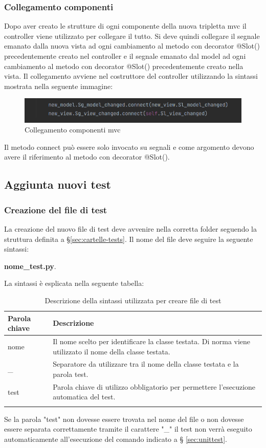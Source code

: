 \subsubsection{Collegamento componenti}
Dopo aver creato le strutture di ogni componente della nuova tripletta mvc il controller viene utilizzato per collegare il tutto. 
Si deve quindi collegare il segnale emanato dalla nuova vista ad ogni cambiamento al metodo con decorator @Slot() precedentemente creato nel controller e il segnale emanato dal model ad ogni cambiamento al metodo con decorator @Slot() precedentemente creato nella vista. Il collegamento avviene nel costruttore del controller utilizzando la sintassi mostrata nella seguente immagine:
\begin{figure}[H]
    \centering
    \includegraphics[scale = 0.50]{components/img/collegamento-segnali-mvc.png}
    \caption{Collegamento componenti mvc}
    \label{fig:Collegamento componenti mvc}
\end{figure}
Il metodo connect può essere solo invocato su segnali e come argomento devono avere il riferimento al metodo con decorator @Slot().

\subsection{Aggiunta nuovi test}
\subsubsection{Creazione del file di test}
La creazione del nuovo file di test deve avvenire nella corretta folder seguendo la struttura definita a \S{}\ref{sec:cartelle-tests}. Il nome del file deve seguire la seguente sintassi: \newline{} \centerline{\textbf{nome\_test.py}.} La sintassi è esplicata nella seguente tabella:
{
	\setlength{\freewidth}{\dimexpr\textwidth-1\tabcolsep}
	\renewcommand{\arraystretch}{1.5}
	\setlength{\aboverulesep}{0pt}
	\setlength{\belowrulesep}{0pt}
	\begin{longtable}{L{.15\freewidth} L{.85\freewidth}}
		\textbf{Parola chiave} & \textbf{Descrizione}\\
		\toprule
		\endhead	
		nome & Il nome scelto per identificare la classe testata. Di norma viene utilizzato il nome della classe testata.\\
		\_ & Separatore da utilizzare tra il nome della classe testata e la parola test.\\
		test & Parola chiave di utilizzo obbligatorio per permettere l'esecuzione automatica del test. \\
		\bottomrule
		\hiderowcolors
		\caption{Descrizione della sintassi utilizzata per creare file di test}
	\end{longtable}
}
Se la parola "test" non dovesse essere trovata nel nome del file o non dovesse essere separata correttamente tramite il carattere "\_" il test non verrà eseguito automaticamente all'esecuzione del comando indicato a \S{} \ref{sec:unittest}.
